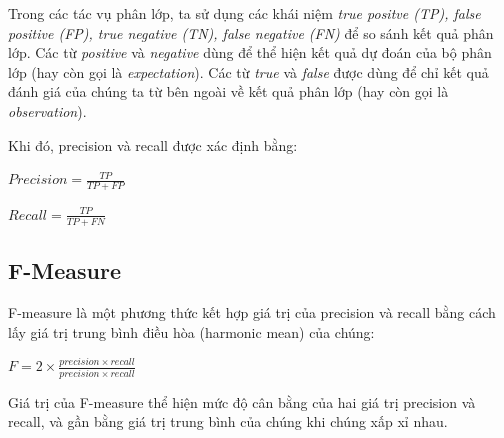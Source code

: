 Trong các tác vụ phân lớp, ta sử dụng các khái niệm \textit{true positve (TP), false positive (FP), true negative (TN), false negative (FN)} để so sánh kết quả phân lớp. Các từ \textit{positive} và \textit{negative} dùng để thể hiện kết quả dự đoán của bộ phân lớp (hay còn gọi là \textit{expectation}). Các từ \textit{true} và \textit{false} được dùng để chỉ kết quả đánh giá của chúng ta từ bên ngoài về kết quả phân lớp (hay còn gọi là  \textit{observation}).

Khi đó, precision và recall được xác định bằng:
\begin{center}
  $Precision = \frac{TP}{TP + FP}$
\end{center}
\begin{center}
  $Recall  = \frac{TP}{TP + FN}$
\end{center}
\subsection{F-Measure}
F-measure là một phương thức kết hợp giá trị của precision và recall bằng cách lấy giá trị trung bình điều hòa (harmonic mean) của chúng:
\begin{center}
  $F = 2\times \frac{precision\times recall}{precision\times recall}$
\end{center}
Giá trị của F-measure thể hiện mức độ cân bằng của hai giá trị precision và recall, và gần bằng giá trị trung bình của chúng khi chúng xấp xỉ nhau.
